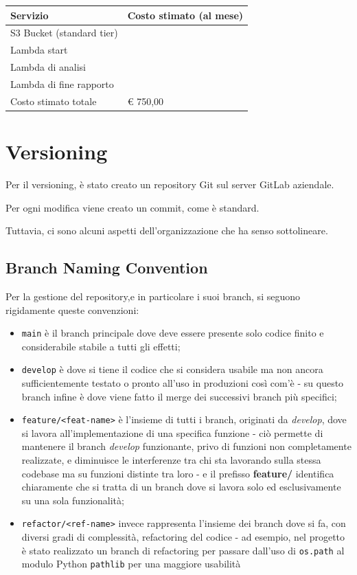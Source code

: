 \begin{table}[H]
    \centering
    \begin{tabular}{|l|l|}
        \hline
        \textbf{Servizio}         & \textbf{Costo stimato (al mese)} \\ \hline
        S3 Bucket (standard tier) &                                  \\
        Lambda start              &                                  \\
        Lambda di analisi         &                                  \\
        Lambda di fine rapporto   &                                  \\ \hline
        Costo stimato totale      & € 750,00                         \\ \hline
    \end{tabular}
\end{table}

\section{Versioning}
Per il versioning, è stato creato un repository Git sul server GitLab aziendale.

Per ogni modifica viene creato un commit, come è standard.

Tuttavia, ci sono alcuni aspetti dell'organizzazione che ha senso sottolineare.

\subsection{Branch Naming Convention}
Per la gestione del repository,e in particolare i suoi branch, si seguono rigidamente queste convenzioni:
\begin{itemize}
    \item \texttt{main} è il branch principale dove deve essere presente solo codice finito e considerabile stabile a tutti gli effetti;
    \item \texttt{develop} è dove si tiene il codice che si considera usabile ma non ancora sufficientemente testato o pronto all'uso in produzioni così com'è - su questo branch infine è dove viene fatto il merge dei successivi branch più specifici;
    \item \texttt{feature/<feat-name>} è l'insieme di tutti i branch, originati da \emph{develop}, dove si lavora all'implementazione di una specifica funzione - ciò permette di mantenere il branch \emph{develop} funzionante, privo di funzioni non completamente realizzate, e diminuisce le interferenze tra chi sta lavorando sulla stessa codebase ma su funzioni distinte tra loro - e il prefisso \textbf{feature/} identifica chiaramente che si tratta di un branch dove si lavora solo ed esclusivamente su una sola funzionalità;
    \item \texttt{refactor/<ref-name>} invece rappresenta l'insieme dei branch dove si fa, con diversi gradi di complessità, refactoring del codice - ad esempio, nel progetto è stato realizzato un branch di refactoring per passare dall'uso di \texttt{os.path} al modulo Python \texttt{pathlib} per una maggiore usabilità
\end{itemize}

